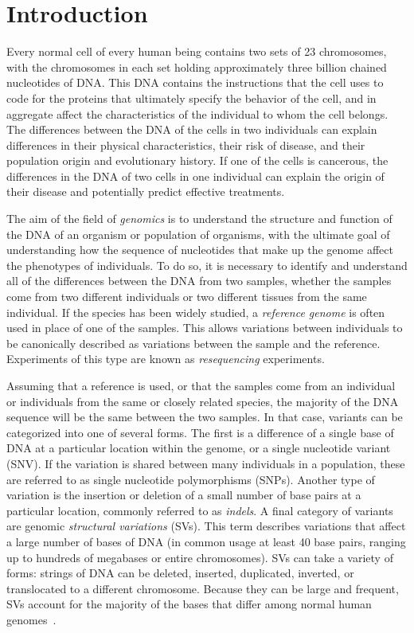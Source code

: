 \documentclass [11pt] {report}
\begin{document}
% 
\chapter{Introduction}

Every normal cell of every human being contains two sets of 23 chromosomes, with the chromosomes in each set holding approximately three billion chained nucleotides of DNA. This DNA contains the instructions that the cell uses to code for the proteins that ultimately specify the behavior of the cell, and in aggregate affect the characteristics of the individual to whom the cell belongs. The differences between the DNA of the cells in two individuals can explain differences in their physical characteristics, their risk of disease, and their population origin and evolutionary history. If one of the cells is cancerous, the differences in the DNA of two cells in one individual can explain the origin of their disease and potentially predict effective treatments.

The aim of the field of \emph{genomics} is to understand the structure and function of the DNA of an organism or population of organisms, with the ultimate goal of understanding how the sequence of nucleotides that make up the genome affect the phenotypes of individuals. To do so, it is necessary to identify and understand all of the differences between the DNA from two samples, whether the samples come from two different individuals or two different tissues from the same individual. If the species has been widely studied, a \emph{reference genome} is often used in place of one of the samples. This allows variations between individuals to be canonically described as variations between the sample and the reference. Experiments of this type are known as \emph{resequencing} experiments.

Assuming that a reference is used, or that the samples come from an individual or individuals from the same or closely related species, the majority of the DNA sequence will be the same between the two samples. In that case, variants can be categorized into one of several forms. The first is a difference of a single base of DNA at a particular location within the genome, or a single nucleotide variant (SNV). If the variation is shared between many individuals in a population, these are referred to as single nucleotide polymorphisms (SNPs). Another type of variation is the insertion or deletion of a small number of base pairs at a particular location, commonly referred to as \emph{indels}. A final category of variants are genomic \emph{structural variations} (SVs). This term describes variations that affect a large number of bases of DNA (in common usage at least 40 base pairs, ranging up to hundreds of megabases or entire chromosomes). SVs can take a variety of forms: strings of DNA can be deleted, inserted, duplicated, inverted, or translocated to a different chromosome. Because they can be large and frequent, SVs account for the majority of the bases that differ among normal human genomes~\cite{Mills:2011p1611, Conrad:2010ja}.
\end{document}
